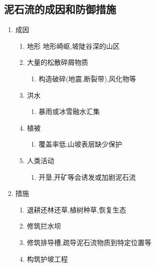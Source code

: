\documentclass[a4paper]{article}
\begin{document}
    \subsection{泥石流的成因和防御措施}
    \begin{enumerate}
        \item 成因
        \begin{enumerate}
            \item 地形
            地形崎岖,坡陡谷深的山区
            \item 大量的松散碎屑物质
            \begin{enumerate}
                \item 构造破碎(地震,断裂带),风化物等
            \end{enumerate}
            \item  洪水
            \begin{enumerate}
                \item 暴雨或冰雪融水汇集
            \end{enumerate}
            \item 植被
            \begin{enumerate}
                \item 覆盖率低,山坡表层缺少保护
            \end{enumerate}
            \item 人类活动
            \begin{enumerate}
                \item 开垦,开矿等会诱发或加剧泥石流
            \end{enumerate}
        \end{enumerate}
        \item 措施
        \begin{enumerate}
            \item 退耕还林还草,植树种草,恢复生态
            \item 修筑拦水坝
            \item 修筑排导槽,疏导泥石流物质到特定位置等
            \item 构筑护坡工程
        \end{enumerate}
    \end{enumerate}
\end{document}
